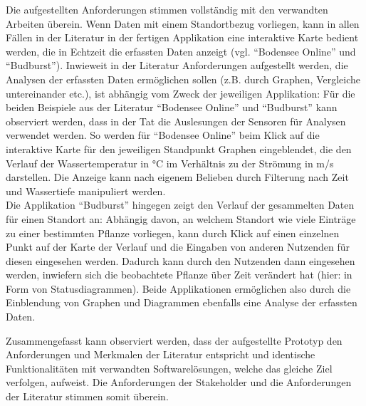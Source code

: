 Die aufgestellten Anforderungen stimmen vollständig mit den verwandten Arbeiten überein. Wenn Daten mit einem Standortbezug vorliegen, kann in allen Fällen in der Literatur in der fertigen Applikation eine interaktive Karte bedient werden, die in Echtzeit die erfassten Daten anzeigt (vgl. \enquote{Bodensee Online} und \enquote{Budburst}). Inwieweit in der Literatur Anforderungen aufgestellt werden, die Analysen der erfassten Daten ermöglichen sollen (z.B. durch Graphen, Vergleiche untereinander etc.), ist abhängig vom Zweck der jeweiligen Applikation: Für die beiden Beispiele aus der Literatur \enquote{Bodensee Online} und \enquote{Budburst} kann observiert werden, dass in der Tat die Auslesungen der Sensoren für Analysen verwendet werden. So werden für \enquote{Bodensee Online} beim Klick auf die interaktive Karte für den jeweiligen Standpunkt Graphen eingeblendet, die den Verlauf der Wassertemperatur in °C im Verhältnis zu der Strömung in m/s darstellen. Die Anzeige kann nach eigenem Belieben durch Filterung nach Zeit und Wassertiefe manipuliert werden. \\ Die Applikation \enquote{Budburst} hingegen zeigt den Verlauf der gesammelten Daten für einen Standort an: Abhängig davon, an welchem Standort wie viele Einträge zu einer bestimmten Pflanze vorliegen, kann durch Klick auf einen einzelnen Punkt auf der Karte der Verlauf und die Eingaben von anderen Nutzenden für diesen eingesehen werden. Dadurch kann durch den Nutzenden dann eingesehen werden, inwiefern sich die beobachtete Pflanze über Zeit verändert hat (hier: in Form von Statusdiagrammen). Beide Applikationen ermöglichen also durch die Einblendung von Graphen und Diagrammen ebenfalls eine Analyse der erfassten Daten. 

Zusammengefasst kann observiert werden, dass der aufgestellte Prototyp den Anforderungen und Merkmalen der Literatur entspricht und identische Funktionalitäten mit verwandten Softwarelösungen, welche das gleiche Ziel verfolgen, aufweist. Die Anforderungen der Stakeholder und die Anforderungen der Literatur stimmen somit überein.

